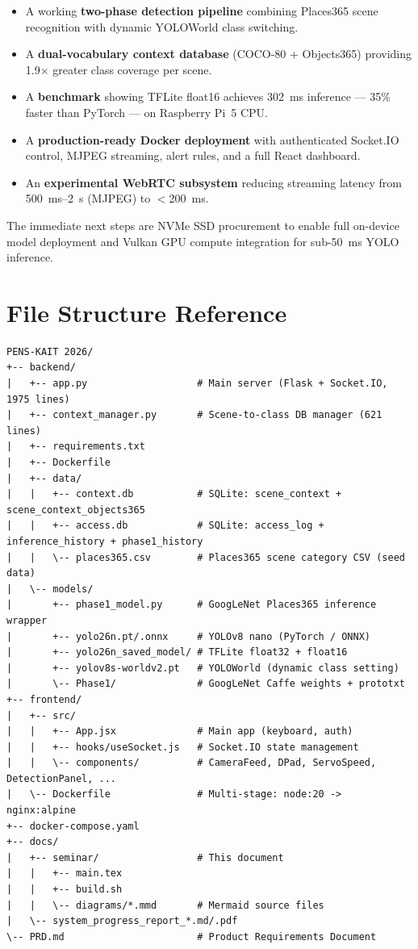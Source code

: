 \documentclass[12pt,a4paper]{article}
\begin{document}
\begin{itemize}[leftmargin=*]
  \item A working \textbf{two-phase detection pipeline} combining Places365
        scene recognition with dynamic YOLOWorld class switching.
  \item A \textbf{dual-vocabulary context database} (COCO-80 + Objects365)
        providing 1.9$\times$ greater class coverage per scene.
  \item A \textbf{benchmark} showing TFLite float16 achieves 302~ms inference
        — 35\% faster than PyTorch — on Raspberry Pi~5 CPU.
  \item A \textbf{production-ready Docker deployment} with authenticated
        Socket.IO control, MJPEG streaming, alert rules, and a full React
        dashboard.
  \item An \textbf{experimental WebRTC subsystem} reducing streaming latency
        from 500~ms--2~s (MJPEG) to $<$200~ms.
\end{itemize}

The immediate next steps are NVMe SSD procurement to enable full on-device
model deployment and Vulkan GPU compute integration for sub-50~ms YOLO
inference.

\appendix
\section{File Structure Reference}

\begin{small}
\begin{verbatim}
PENS-KAIT 2026/
+-- backend/
|   +-- app.py                   # Main server (Flask + Socket.IO, 1975 lines)
|   +-- context_manager.py       # Scene-to-class DB manager (621 lines)
|   +-- requirements.txt
|   +-- Dockerfile
|   +-- data/
|   |   +-- context.db           # SQLite: scene_context + scene_context_objects365
|   |   +-- access.db            # SQLite: access_log + inference_history + phase1_history
|   |   \-- places365.csv        # Places365 scene category CSV (seed data)
|   \-- models/
|       +-- phase1_model.py      # GoogLeNet Places365 inference wrapper
|       +-- yolo26n.pt/.onnx     # YOLOv8 nano (PyTorch / ONNX)
|       +-- yolo26n_saved_model/ # TFLite float32 + float16
|       +-- yolov8s-worldv2.pt   # YOLOWorld (dynamic class setting)
|       \-- Phase1/              # GoogLeNet Caffe weights + prototxt
+-- frontend/
|   +-- src/
|   |   +-- App.jsx              # Main app (keyboard, auth)
|   |   +-- hooks/useSocket.js   # Socket.IO state management
|   |   \-- components/          # CameraFeed, DPad, ServoSpeed, DetectionPanel, ...
|   \-- Dockerfile               # Multi-stage: node:20 -> nginx:alpine
+-- docker-compose.yaml
+-- docs/
|   +-- seminar/                 # This document
|   |   +-- main.tex
|   |   +-- build.sh
|   |   \-- diagrams/*.mmd       # Mermaid source files
|   \-- system_progress_report_*.md/.pdf
\-- PRD.md                       # Product Requirements Document
\end{verbatim}
\end{small}
\end{document}
